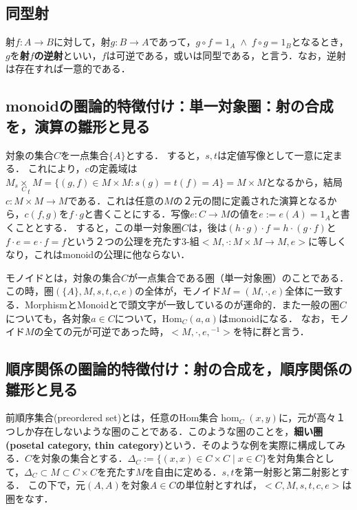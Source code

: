 \documentclass[uplatex, 12pt, dvipdfmx]{jsreport}
\begin{document}
\subsection{同型射}

\begin{shadebox}\begin{definition}[可逆，同型，逆射]
    射$f:A\rightarrow B$に対して，射$g:B\rightarrow A$であって，$g\circ f=1_A \; \wedge \; f\circ g=1_B$となるとき，$g$を\textbf{射$f$の逆射}といい，$f$は可逆である，或いは同型である，と言う．なお，逆射は存在すれば一意的である．
\end{definition}\end{shadebox}

\subsection{monoidの圏論的特徴付け：単一対象圏：射の合成を，演算の雛形と見る}

対象の集合$C$を一点集合$\{ A\}$とする．
すると，$s,t$は定値写像として一意に定まる．
これにより，$c$の定義域は$M_s\underset{C}{\times}_tM=\{ (g,f)\in M\times M : s(g)=t(f)=A \}=M\times M$となるから，結局$c:M\times M\rightarrow M$である．これは任意の$M$の２元の間に定義された演算となるから，$c(f,g)$を$f\cdot g$と書くことにする．写像$e:C\rightarrow M$の値を$e:=e(A)=1_A$と書くこととする．
すると，この単一対象圏$C$は，後は$(h\cdot g)\cdot f = h\cdot (g\cdot f)$と$f\cdot e=e\cdot f = f$という２つの公理を充たす3-組$<M,\cdot :M\times M\rightarrow M,e>$に等しくなり，これはmonoidの公理に他ならない．

\begin{screen}
    モノイドとは，対象の集合$C$が一点集合である圏（単一対象圏）のことである．この時，圏$(\{ A\}, M, s, t, c, e)$の全体が，モノイド$M=(M,\cdot,e)$全体に一致する．MorphismとMonoidとで頭文字が一致しているのが運命的．また一般の圏$C$についても，各対象$a\in C$について，$\mathrm{Hom}_C(a,a)$はmonoidになる．
    なお，モノイド$M$の全ての元が可逆であった時，$<M,\cdot,e,{}^{-1}>$を特に群と言う．
\end{screen}

\subsection{順序関係の圏論的特徴付け：射の合成を，順序関係の雛形と見る}

前順序集合(preordered set)とは，任意のHom集合$\hom_C(x,y)$に，元が高々１つしか存在しないような圏のことである．このような圏のことを，\textbf{細い圏(posetal category, thin category)}という．そのような例を実際に構成してみる．$C$を対象の集合とする．$\Delta_C :=\{ (x,x)\in C\times C \mid x\in C \}$を対角集合として，$\Delta_C \subset M\subset C\times C$を充たす$M$を自由に定める．$s,t$を第一射影と第二射影とする．
この下で，元$(A,A)$を対象$A\in C$の単位射とすれば，$<C,M,s,t,c,e>$は圏をなす．
\end{document}
